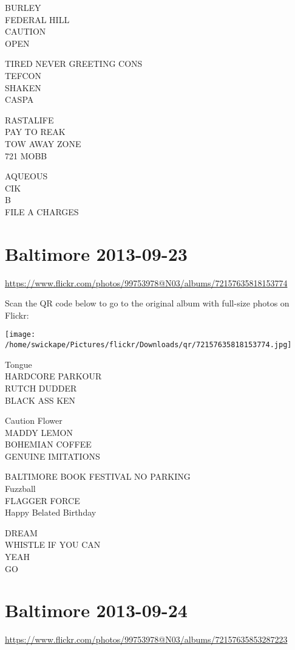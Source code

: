 \documentclass[10pt,letterpaper]{article}
\begin{document}
BURLEY\\
FEDERAL HILL\\
CAUTION\\
OPEN

TIRED NEVER GREETING CONS\\
TEFCON\\
SHAKEN\\
CASPA

RASTALIFE\\
PAY TO REAK\\
TOW AWAY ZONE\\
721 MOBB

AQUEOUS\\
CIK\\
B\\
FILE A CHARGES


\section*{Baltimore 2013-09-23}

\url{https://www.flickr.com/photos/99753978@N03/albums/72157635818153774}

Scan the QR code below to go to the original album with full-size photos on Flickr:

\texttt{[image: /home/swickape/Pictures/flickr/Downloads/qr/72157635818153774.jpg]}


Tongue\\
HARDCORE PARKOUR\\
RUTCH DUDDER\\
BLACK ASS KEN

Caution Flower\\
MADDY LEMON\\
BOHEMIAN COFFEE\\
GENUINE IMITATIONS

BALTIMORE BOOK FESTIVAL NO PARKING\\
Fuzzball\\
FLAGGER FORCE\\
Happy Belated Birthday

DREAM\\
WHISTLE IF YOU CAN\\
YEAH\\
GO


\section*{Baltimore 2013-09-24}

\url{https://www.flickr.com/photos/99753978@N03/albums/72157635853287223}
\end{document}
